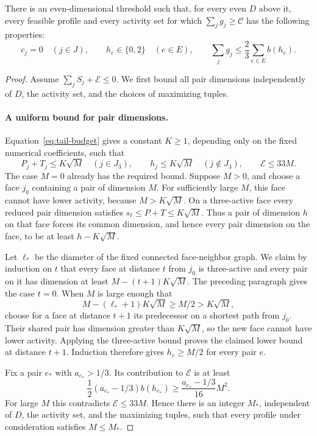 \begin{lemma}\label{lem:tail-residue}
There is an even-dimensional threshold such that, for every even $D$
above it, every feasible profile and every activity set for which
$\sum_jg_j\ge\mathcal C$ has the following properties:
\begin{equation}\label{eq:tail-residual-profile}
 c_j=0\quad(j\in J),\qquad h_e\in\{0,2\}\quad(e\in E),
 \qquad\sum_jg_j\le\frac23\sum_{e\in E}b(h_e).
\end{equation}
\end{lemma}

\begin{proof}
Assume \(\sum_j S_j+\mathcal E\le0\). We first bound all pair
dimensions independently of \(D\), the activity set, and the choices
of maximizing tuples.

\paragraph{A uniform bound for pair dimensions.}
Equation~\eqref{eq:tail-budget} gives a constant \(K\ge1\), depending
only on the fixed numerical coefficients, such that
\[
 P_j+T_j\le K\sqrt M\quad(j\in J_3),\qquad
 h_j\le K\sqrt M\quad(j\notin J_3),\qquad
 \mathcal E\le33M.
\]
The case \(M=0\) already has the required bound. Suppose \(M>0\),
and choose a face \(j_0\) containing a pair of dimension \(M\).
For sufficiently large \(M\), this face cannot have lower activity,
because \(M>K\sqrt M\). On a three-active face every reduced pair
dimension satisfies \(s_\ell\le P+T\le K\sqrt M\). Thus a pair of
dimension \(h\) on that face forces its common dimension, and hence
every pair dimension on the face, to be at least \(h-K\sqrt M\).

Let \(\ell_*\) be the diameter of the fixed connected face-neighbor
graph. We claim by induction on \(t\) that every face at distance
\(t\) from \(j_0\) is three-active and every pair on it has dimension
at least \(M-(t+1)K\sqrt M\). The preceding paragraph gives the case
\(t=0\). When \(M\) is large enough that
\[
 M-(\ell_*+1)K\sqrt M\ge M/2>K\sqrt M,
\]
choose for a face at distance \(t+1\) its predecessor on a shortest
path from \(j_0\). Their shared pair has dimension greater than
\(K\sqrt M\), so the new face cannot have lower activity. Applying
the three-active bound proves the claimed lower bound at distance
\(t+1\).
Induction therefore gives \(h_e\ge M/2\) for every pair \(e\).

Fix a pair \(e_*\) with \(a_{e_*}>1/3\). Its contribution to
\(\mathcal E\) is at least
\[
 \frac12(a_{e_*}-1/3)b(h_{e_*})
 \ge \frac{a_{e_*}-1/3}{16}M^2.
\]
For large \(M\) this contradicts \(\mathcal E\le33M\). Hence there is
an integer \(M_*\), independent of \(D\), the activity set, and the
maximizing tuples, such that every profile under consideration
satisfies \(M\le M_*\).


\end{proof}
